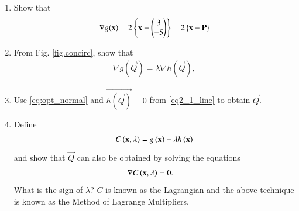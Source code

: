 \begin{enumerate}[label=\arabic*.,ref=\thesection.\theenumi]
\item Show that 
\begin{align}
\nabla g(\mathbf{x}) = 2\left\{\mathbf{x}-\begin{pmatrix}3 \\ -5\end{pmatrix}\right\} = 2\left\{\mathbf{x}-\mathbf{P}\right\}
\end{align}
%
\item From Fig. \ref{fig.concirc}, show that 
\begin{align}
\label{eq:opt_normal}
\nabla g(\vec{Q}) = \lambda \nabla h(\vec{Q}),
\end{align}
%
\item Use \eqref{eq:opt_normal} and $\vec{h(\vec{Q})}=0$ from \eqref{eq2_1_line} to obtain $\vec{Q}$.
\item
\label{lagrange}
	Define 
	\begin{equation}
	\label{lagrangian}
	C\brak{\mbf{x},\lambda} = g\brak{\mbf{x}} - \lambda h\brak{\mbf{x}}%
	\end{equation}
and show that $\vec{Q}$ can also be obtained by 
solving the equations
%
\begin{align}
\nabla C\left(\mathbf{x},\lambda\right) &= 0.
\label{tangent}
\end{align}
%
What is the sign of $\lambda$?  $C$ is known as the Lagrangian and the above technique is known as the Method of Lagrange Multipliers.


\end{enumerate}
